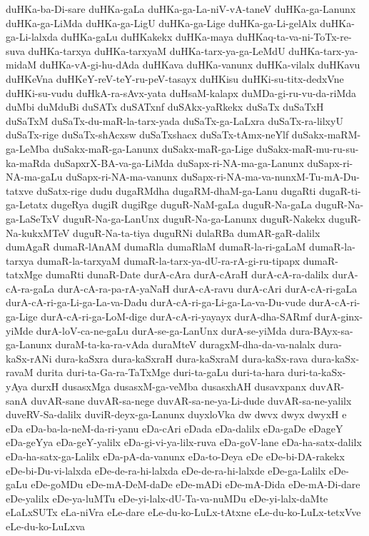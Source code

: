 {duHKa-ba-Di-sare
duHKa-gaLa
duHKa-ga-La-niV-vA-taneV
duHKa-ga-Lanunx
duHKa-ga-LiMda
duHKa-ga-LigU
duHKa-ga-Lige
duHKa-ga-Li-gelAlx
duHKa-ga-Li-lalxda
duHKa-gaLu
duHKakekx
duHKa-maya
duHKaq-ta-va-ni-ToTx-re-suva
duHKa-tarxya
duHKa-tarxyaM
duHKa-tarx-ya-ga-LeMdU
duHKa-tarx-ya-midaM
duHKa-vA-gi-hu-dAda
duHKava
duHKa-vanunx
duHKa-vilalx
duHKavu
duHKeVna
duHKeY-reV-teY-ru-peV-tasayx
duHKisu
duHKi-su-titx-dedxVne
duHKi-su-vudu
duHkA-ra-sAvx-yata
duHsaM-kalapx
duMDa-gi-ru-vu-da-riMda
duMbi
duMduBi
duSATx
duSATxnf
duSAkx-yaRkekx
duSaTx
duSaTxH
duSaTxM
duSaTx-du-maR-la-tarx-yada
duSaTx-ga-LaLxra
duSaTx-ra-lilxyU
duSaTx-rige
duSaTx-shAcxsw
duSaTxshacx
duSaTx-tAmx-neYlf
duSakx-maRM-ga-LeMba
duSakx-maR-ga-Lanunx
duSakx-maR-ga-Lige
duSakx-maR-mu-ru-su-ka-maRda
duSapxrX-BA-va-ga-LiMda
duSapx-ri-NA-ma-ga-Lanunx
duSapx-ri-NA-ma-gaLu
duSapx-ri-NA-ma-vanunx
duSapx-ri-NA-ma-va-nunxM-Tu-mA-Du-tatxve
duSatx-rige
dudu
dugaRMdha
dugaRM-dhaM-ga-Lanu
dugaRti
dugaR-ti-ga-Letatx
dugeRya
dugiR
dugiRge
duguR-NaM-gaLa
duguR-Na-gaLa
duguR-Na-ga-LaSeTxV
duguR-Na-ga-LanUnx
duguR-Na-ga-Lanunx
duguR-Nakekx
duguR-Na-kukxMTeV
duguR-Na-ta-tiya
duguRNi
dulaRBa
dumAR-gaR-dalilx
dumAgaR
dumaR-lAnAM
dumaRla
dumaRlaM
dumaR-la-ri-gaLaM
dumaR-la-tarxya
dumaR-la-tarxyaM
dumaR-la-tarx-ya-dU-ra-rA-gi-ru-tipapx
dumaR-tatxMge
dumaRti
dunaR-Date
durA-cAra
durA-cAraH
durA-cA-ra-dalilx
durA-cA-ra-gaLa
durA-cA-ra-pa-rA-yaNaH
durA-cA-ravu
durA-cAri
durA-cA-ri-gaLa
durA-cA-ri-ga-Li-ga-La-va-Dadu
durA-cA-ri-ga-Li-ga-La-va-Du-vude
durA-cA-ri-ga-Lige
durA-cA-ri-ga-LoM-dige
durA-cA-ri-yayayx
durA-dha-SARmf
durA-ginx-yiMde
durA-loV-ca-ne-gaLu
durA-se-ga-LanUnx
durA-se-yiMda
dura-BAyx-sa-ga-Lanunx
duraM-ta-ka-ra-vAda
duraMteV
duragxM-dha-da-va-nalalx
dura-kaSx-rANi
dura-kaSxra
dura-kaSxraH
dura-kaSxraM
dura-kaSx-rava
dura-kaSx-ravaM
durita
duri-ta-Ga-ra-TaTxMge
duri-ta-gaLu
duri-ta-hara
duri-ta-kaSx-yAya
durxH
dusasxMga
dusasxM-ga-veMba
dusasxhAH
dusavxpanx
duvAR-sanA
duvAR-sane
duvAR-sa-nege
duvAR-sa-ne-ya-Li-dude
duvAR-sa-ne-yalilx
duveRV-Sa-dalilx
duviR-deyx-ga-Lanunx
duyxloVka
dw
dwvx
dwyx
dwyxH
e
eDa
eDa-ba-la-neM-da-ri-yanu
eDa-cAri
eDada
eDa-dalilx
eDa-gaDe
eDageY
eDa-geYya
eDa-geY-yalilx
eDa-gi-vi-ya-lilx-ruva
eDa-goV-lane
eDa-ha-satx-dalilx
eDa-ha-satx-ga-Lalilx
eDa-pA-da-vanunx
eDa-to-Deya
eDe
eDe-bi-DA-rakekx
eDe-bi-Du-vi-lalxda
eDe-de-ra-hi-lalxda
eDe-de-ra-hi-lalxde
eDe-ga-Lalilx
eDe-gaLu
eDe-goMDu
eDe-mA-DeM-daDe
eDe-mADi
eDe-mA-Dida
eDe-mA-Di-dare
eDe-yalilx
eDe-ya-luMTu
eDe-yi-lalx-dU-Ta-va-nuMDu
eDe-yi-lalx-daMte
eLaLxSUTx
eLa-niVra
eLe-dare
eLe-du-ko-LuLx-tAtxne
eLe-du-ko-LuLx-tetxVve
eLe-du-ko-LuLxva
}
